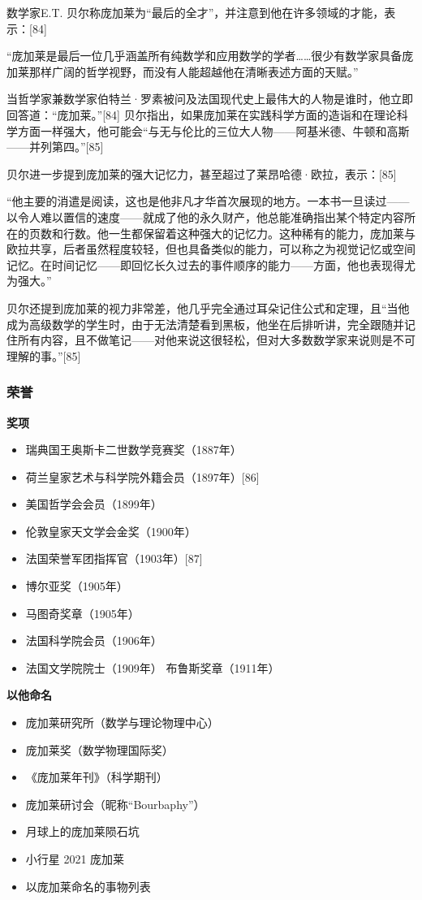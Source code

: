 数学家E.T. 贝尔称庞加莱为“最后的全才”，并注意到他在许多领域的才能，表示：[84]

“庞加莱是最后一位几乎涵盖所有纯数学和应用数学的学者……很少有数学家具备庞加莱那样广阔的哲学视野，而没有人能超越他在清晰表述方面的天赋。”

当哲学家兼数学家伯特兰·罗素被问及法国现代史上最伟大的人物是谁时，他立即回答道：“庞加莱。”[84] 贝尔指出，如果庞加莱在实践科学方面的造诣和在理论科学方面一样强大，他可能会“与无与伦比的三位大人物——阿基米德、牛顿和高斯——并列第四。”[85]

贝尔进一步提到庞加莱的强大记忆力，甚至超过了莱昂哈德·欧拉，表示：[85]

“他主要的消遣是阅读，这也是他非凡才华首次展现的地方。一本书一旦读过——以令人难以置信的速度——就成了他的永久财产，他总能准确指出某个特定内容所在的页数和行数。他一生都保留着这种强大的记忆力。这种稀有的能力，庞加莱与欧拉共享，后者虽然程度较轻，但也具备类似的能力，可以称之为视觉记忆或空间记忆。在时间记忆——即回忆长久过去的事件顺序的能力——方面，他也表现得尤为强大。”

贝尔还提到庞加莱的视力非常差，他几乎完全通过耳朵记住公式和定理，且“当他成为高级数学的学生时，由于无法清楚看到黑板，他坐在后排听讲，完全跟随并记住所有内容，且不做笔记——对他来说这很轻松，但对大多数数学家来说则是不可理解的事。”[85]
\subsubsection{荣誉}  
\textbf{奖项}  
\begin{itemize}
\item 瑞典国王奥斯卡二世数学竞赛奖（1887年）  
\item 荷兰皇家艺术与科学院外籍会员（1897年）[86]  
\item 美国哲学会会员（1899年）  
\item 伦敦皇家天文学会金奖（1900年）  
\item 法国荣誉军团指挥官（1903年）[87]  
\item 博尔亚奖（1905年）  
\item 马图奇奖章（1905年）  
\item 法国科学院会员（1906年）  
\item 法国文学院院士（1909年）  
布鲁斯奖章（1911年）
\end{itemize}  
\textbf{以他命名}  
\begin{itemize}
\item 庞加莱研究所（数学与理论物理中心）  
\item 庞加莱奖（数学物理国际奖）  
\item 《庞加莱年刊》（科学期刊）  
\item 庞加莱研讨会（昵称“Bourbaphy”）  
\item 月球上的庞加莱陨石坑  
\item 小行星 2021 庞加莱  
\item 以庞加莱命名的事物列表 
\end{itemize} 

